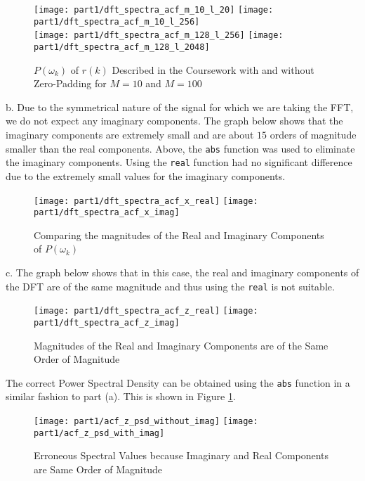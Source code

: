 \begin{figure}[H]
\centering{}
\texttt{[image: part1/dft\_spectra\_acf\_m\_10\_l\_20]}
\texttt{[image: part1/dft\_spectra\_acf\_m\_10\_l\_256]} \\
\texttt{[image: part1/dft\_spectra\_acf\_m\_128\_l\_256]}
\texttt{[image: part1/dft\_spectra\_acf\_m\_128\_l\_2048]}
\caption{$P(\omega_{k})$ of $r(k)$ Described in the Coursework with and without Zero-Padding for $M=10$ and $M=100$}
\end{figure}

\noindent{}b. Due to the symmetrical nature of the signal for which we are taking the FFT, we do not expect any imaginary components. The graph below shows that the imaginary components are extremely small and are about $15$ orders of magnitude smaller than the real components. Above, the \texttt{abs} function was used to eliminate the imaginary components. Using the \texttt{real} function had no significant difference due to the extremely small values for the imaginary components.

\begin{figure}[H]
\centering{}
\texttt{[image: part1/dft\_spectra\_acf\_x\_real]}
\texttt{[image: part1/dft\_spectra\_acf\_x\_imag]}
\caption{Comparing the magnitudes of the Real and Imaginary Components of $P(\omega_k)$}
\end{figure}


\noindent{}c. The graph below shows that in this case, the real and imaginary components of the DFT are of the same magnitude and thus using the \texttt{real} is not suitable.

\begin{figure}[H]
\centering{}
\texttt{[image: part1/dft\_spectra\_acf\_z\_real]}
\texttt{[image: part1/dft\_spectra\_acf\_z\_imag]}
\caption{Magnitudes of the Real and Imaginary Components are of the Same Order of Magnitude} 
\end{figure}

\newpage
\noindent{}The correct Power Spectral Density can be obtained using the \texttt{abs} function in a similar fashion to part (a). This is shown in Figure \ref{fig:correct_psd_using_abs}.
\begin{figure}[H]
\centering{}
\texttt{[image: part1/acf\_z\_psd\_without\_imag]}
\texttt{[image: part1/acf\_z\_psd\_with\_imag]}
\caption{Erroneous Spectral Values because Imaginary and Real Components are Same Order of Magnitude}
\label{fig:correct_psd_using_abs}
\end{figure}

